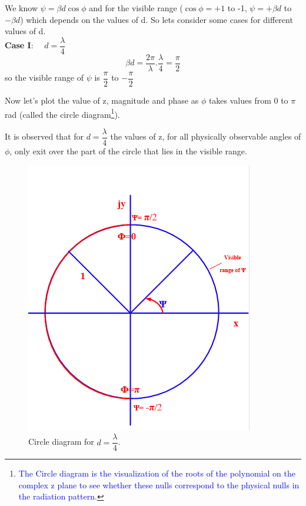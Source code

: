 We know $\psi=\beta d\cos\phi$ and for the visible range ($\cos\phi=+1$ to -1, $\psi=+\beta d$ to $-\beta d$) which depends on the values of d. So lets consider some cases for different values of d.\\
\textbf{Case I}: $\quad d=\dfrac{\lambda}{4}$
$$\beta d=\dfrac{2\pi}{\lambda}.\dfrac{\lambda}{4}=\dfrac{\pi}{2}$$ so the visible range of $\psi$ is $\dfrac{\pi}{2}$ to $-\dfrac{\pi}{2}$

Now let's plot the value of z, magnitude and phase as $\phi$ takes values from 0 to $\pi$ rad (called the circle diagram\footnote{\textcolor{blue}{The Circle diagram is the visualization of the roots of the polynomial on the complex z plane to see whether these nulls correspond to the physical nulls in the radiation pattern.}}).

It is observed that for $d=\dfrac{\lambda}{4}$ the values of z, for all physically observable angles of $\phi$, only exit over the part of the circle that lies in the visible range.
\begin{figure}[h]
\centering
\includegraphics[width=1\linewidth]{"./graphics/fig 55_3"}
\caption{  Circle diagram for $d=\dfrac{\lambda}{4}$.}
\label{fig:fig-55-3}
\end{figure}

